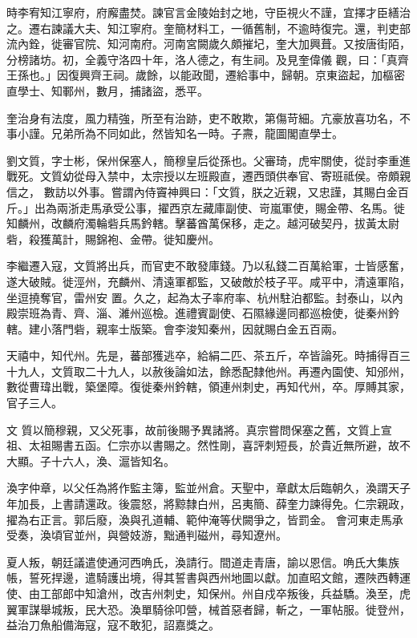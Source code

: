 \begin{pinyinscope}
 時李宥知江寧府，府廨盡焚。諫官言金陵始封之地，守臣視火不謹，宜擇才臣繕治之。遷右諫議大夫、知江寧府。奎簡材料工，一循舊制，不逾時復完。還，判吏部流內銓，徙審官院、知河南府。河南宮闕歲久頗摧圮，奎大加興葺。又按唐街陌，分榜諸坊。初，全義守洛四十年，洛人德之，有生祠。及見奎偉儀
 觀，曰：「真齊王孫也。」因復興齊王祠。歲餘，以能政聞，遷給事中，歸朝。京東盜起，加樞密直學士、知鄆州，數月，捕諸盜，悉平。



 奎治身有法度，風力精強，所至有治跡，吏不敢欺，第傷苛細。亢豪放喜功名，不事小謹。兄弟所為不同如此，然皆知名一時。子燾，龍圖閣直學士。



 劉文質，字士彬，保州保塞人，簡穆皇后從孫也。父審琦，虎牢關使，從討李重進戰死。文質幼從母入禁中，太宗授以左班殿直，遷西頭供奉官、寄班祗侯。帝頗親信之，
 數訪以外事。嘗謂內侍竇神興曰：「文質，朕之近親，又忠謹，其賜白金百斤。」出為兩浙走馬承受公事，擢西京左藏庫副使、岢嵐軍使，賜金帶、名馬。徙知麟州，改麟府濁輪砦兵馬鈐轄。擊蕃酋萬保移，走之。越河破契丹，拔黃太尉砦，殺獲萬計，賜錦袍、金帶。徙知慶州。



 李繼遷入寇，文質將出兵，而官吏不敢發庫錢。乃以私錢二百萬給軍，士皆感奮，遂大破賊。徙涇州，充麟州、清遠軍都監，又破敵於枝子平。咸平中，清遠軍陷，坐逗撓奪官，雷州安
 置。久之，起為太子率府率、杭州駐泊都監。封泰山，以內殿崇班為青、齊、淄、濰州巡檢。進禮賓副使、石隰緣邊同都巡檢使，徙秦州鈐轄。建小落門砦，親率士版築。會李浚知秦州，因就賜白金五百兩。



 天禧中，知代州。先是，蕃部獲逃卒，給絹二匹、茶五斤，卒皆論死。時捕得百三十九人，文質取二十九人，以赦後論如法，餘悉配隸他州。再遷內園使、知邠州，數從曹瑋出戰，築堡障。復徙秦州鈐轄，領連州刺史，再知代州，卒。厚賻其家，官子三人。



 文
 質以簡穆親，又父死事，故前後賜予異諸將。真宗嘗問保塞之舊，文質上宣祖、太祖賜書五函。仁宗亦以書賜之。然性剛，喜評刺短長，於貴近無所避，故不大顯。子十六人，渙、滬皆知名。



 渙字仲章，以父任為將作監主簿，監並州倉。天聖中，章獻太后臨朝久，渙謂天子年加長，上書請還政。後震怒，將黥隸白州，呂夷簡、薛奎力諫得免。仁宗親政，擢為右正言。郭后廢，渙與孔道輔、範仲淹等伏闕爭之，皆罰金。
 會河東走馬承受奏，渙頃官並州，與營妓游，黜通判磁州，尋知遼州。



 夏人叛，朝廷議遣使通河西唃氏，渙請行。間道走青唐，諭以恩信。唃氏大集族帳，誓死捍邊，遣騎護出境，得其誓書與西州地圖以獻。加直昭文館，遷陜西轉運使、由工部郎中知滄州，改吉州刺史，知保州。州自戍卒叛後，兵益驕。渙至，虎翼軍謀舉城叛，民大恐。渙單騎徐叩營，械首惡者歸，斬之，一軍帖服。徙登州，益治刀魚船備海寇，寇不敢犯，詔嘉獎之。




\end{pinyinscope}
